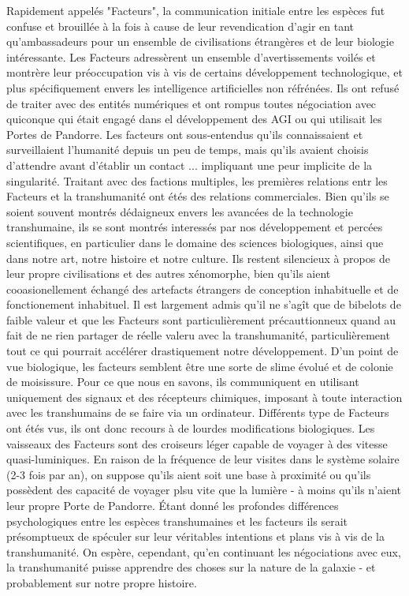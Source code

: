Rapidement appelés "Facteurs", la communication initiale entre les espèces fut confuse et brouillée à la fois à cause de leur revendication d'agir en tant qu'ambassadeurs pour un ensemble de civilisations étrangères et de leur biologie intéressante. Les Facteurs adressèrent un ensemble d'avertissements voilés et montrère leur préoccupation vis à vis de certains développement technologique, et plus spécifiquement envers les intelligence artificielles non réfrénées. Ils ont refusé de traiter avec des entités numériques et ont rompus toutes négociation avec quiconque qui était engagé dans el développement des AGI ou qui utilisait les Portes de Pandorre. Les facteurs ont sous-entendus qu'ils connaissaient et surveillaient l'humanité depuis un peu de temps, mais qu'ils avaient choisis d'attendre avant d'établir un contact ... impliquant une peur implicite de la singularité. Traitant avec des factions multiples, les premières relations entr les Facteurs et la transhumanité ont étés des relations commerciales. Bien qu'ils se soient souvent montrés dédaigneux envers les avancées de la technologie transhumaine, ils se sont montrés interessés par nos développement et percées scientifiques, en particulier dans le domaine des sciences biologiques, ainsi que dans notre art, notre histoire et notre culture. Ils restent silencieux à propos de leur propre civilisations et des autres xénomorphe, bien qu'ils aient cooasionellement échangé des artefacts étrangers de conception inhabituelle et de fonctionement inhabituel. Il est largement admis qu'il ne s'agît que de bibelots de faible valeur et que les Facteurs sont particulièrement précauttionneux quand au fait de ne rien partager de réelle valeru avec la transhumanité, particulièrement tout ce qui pourrait accélérer drastiquement notre développement. D'un point de vue biologique, les facteurs semblent être une sorte de slime évolué et de colonie de moisissure. Pour ce que nous  en savons, ils communiquent en utilisant uniquement des signaux et des récepteurs chimiques, imposant à toute interaction avec les transhumains de se faire via un ordinateur. Différents type de Facteurs ont étés vus, ils ont donc recours à de lourdes modifications biologiques. Les vaisseaux des Facteurs sont des croiseurs léger capable de voyager à des vitesse quasi-luminiques. En raison de la fréquence de leur visites dans le système solaire (2-3 fois par an), on suppose qu'ils aient soit une base à proximité ou qu'ils possèdent des capacité de voyager plsu vite que la lumière - à moins qu'ils n'aient leur propre Porte de Pandorre. Étant donné les profondes différences psychologiques entre les espèces transhumaines et les facteurs ils serait présomptueux de spéculer sur leur véritables intentions et plans vis à vis de la transhumanité. On espère, cependant, qu'en continuant les négociations avec eux, la transhumanité puisse apprendre des choses sur la nature de la galaxie - et probablement sur notre propre histoire. 

